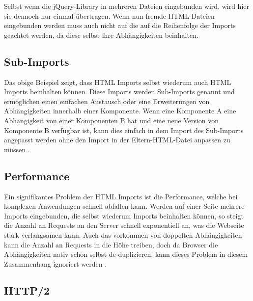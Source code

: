 

Selbst wenn die jQuery-Library in mehreren Dateien eingebunden wird, wird hier sie dennoch nur einmal übertragen. Wenn nun fremde \ac{HTML}-Dateien eingebunden werden muss auch nicht auf die auf die Reihenfolge der Imports geachtet werden, da diese selbst ihre Abhängigkeiten beinhalten.


\subsection{Sub-Imports}\label{sub-imports}

Das obige Beispiel zeigt, dass \ac{HTML} Imports selbst wiederum auch \ac{HTML} Imports beinhalten können. Diese Imports werden Sub-Imports genannt und ermöglichen einen einfachen Austausch oder eine Erweiterungen von Abhängigkeiten innerhalb einer Komponente. Wenn eine Komponente A eine Abhängigkeit von einer Komponenten B hat und eine neue Version von Komponente B verfügbar ist, kann dies einfach in dem Import des Sub-Imports angepasst werden ohne den Import in der Eltern-\ac{HTML}-Datei anpassen zu müssen \cite{citeulike:13853647}.


\subsection{Performance}\label{html-import-performance}

Ein signifikantes Problem der \ac{HTML} Imports ist die Performance, welche bei komplexen Anwendungen schnell abfallen kann. Werden auf einer Seite mehrere Imports eingebunden, die selbst wiederum Imports beinhalten können, so steigt die Anzahl an Requests an den Server schnell exponentiell an, was die Webseite stark verlangsamen kann. Auch das vorkommen von doppelten Abhängigkeiten kann die Anzahl an Requests in die Höhe treiben, doch da Browser die Abhängigkeiten nativ schon selbst de-duplizieren, kann dieses Problem in diesem Zusammenhang ignoriert werden \cite{citeulike:13853714}.


\subsection{HTTP/2}\label{http2}

